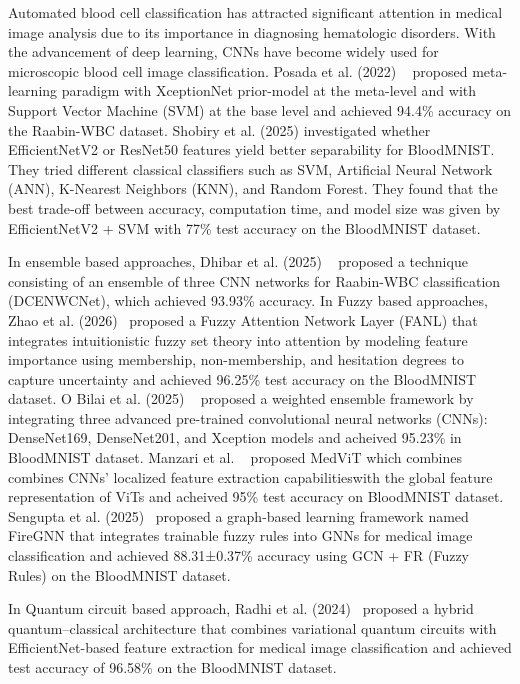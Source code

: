 \documentclass[preprint,12pt]{elsarticle}
\begin{document}
Automated blood cell classification has attracted significant attention in medical image analysis due to its importance in diagnosing hematologic disorders. With the advancement of deep learning, CNNs have become widely used for microscopic blood cell image classification. Posada et al. (2022) ~\cite{b43} proposed meta-learning paradigm with XceptionNet prior-model at the meta-level and with Support Vector Machine (SVM) at the base level and achieved 94.4\% accuracy on the Raabin-WBC dataset. Shobiry et al. (2025) \cite{b17} investigated whether EfficientNetV2 or ResNet50 features yield better separability for BloodMNIST. They tried different classical classifiers such as SVM, Artificial Neural Network (ANN), K-Nearest Neighbors (KNN), and Random Forest. They found that the best trade-off between accuracy, computation time, and model size was given by EfficientNetV2 + SVM with 77\% test accuracy on the BloodMNIST dataset.

In ensemble based approaches, Dhibar et al. (2025) ~\cite{b41} proposed a technique consisting of an ensemble of three CNN networks for Raabin-WBC classification (DCENWCNet), which achieved  93.93\% accuracy. In Fuzzy based approaches, Zhao et al. (2026)~\cite{b38} proposed a Fuzzy Attention Network Layer (FANL) that integrates intuitionistic fuzzy set theory into attention by modeling feature importance using membership, non-membership, and hesitation degrees to capture uncertainty and achieved 96.25\% test accuracy on the BloodMNIST dataset. O Bilai et al. (2025) ~\cite{b45} proposed a weighted ensemble framework by integrating three advanced pre-trained convolutional neural networks (CNNs): DenseNet169, DenseNet201, and Xception models and acheived 95.23\% in BloodMNIST dataset. Manzari et al. ~\cite{b46} proposed MedViT which combines combines CNNs’ localized feature extraction capabilitieswith the global feature representation of ViTs and acheived 95\% test accuracy on BloodMNIST dataset. Sengupta et al. (2025)~\cite{b39} proposed  a graph-based learning framework named FireGNN that integrates trainable fuzzy rules into GNNs for medical image classification and achieved 88.31±0.37\% accuracy using GCN + FR (Fuzzy Rules) on the BloodMNIST dataset.

In Quantum circuit based approach, Radhi et al. (2024)~\cite{b16} proposed a hybrid quantum–classical architecture that combines variational quantum circuits with EfficientNet-based feature extraction for medical image classification and achieved test accuracy of 96.58\% on the BloodMNIST dataset.
\end{document}
